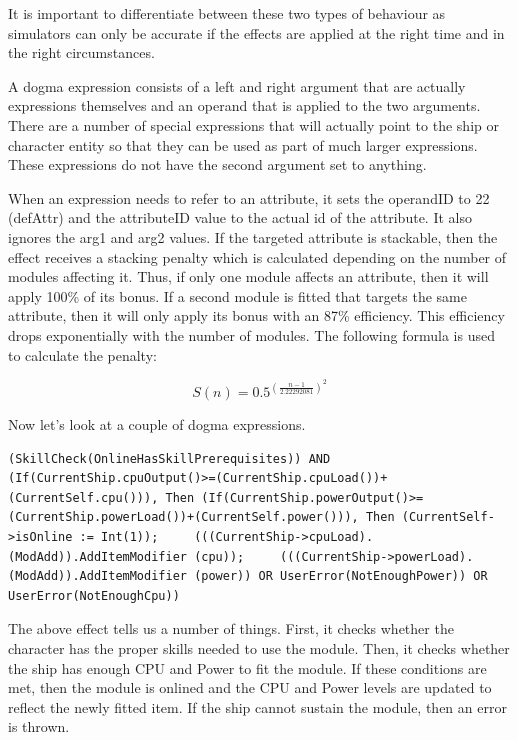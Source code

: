 It is important to differentiate between these two types of behaviour as simulators can only be accurate if the effects are applied at the right time and in the right circumstances.

A dogma expression consists of a left and right argument that are actually expressions themselves and an operand that is applied to the two arguments. There are a number of special expressions that will actually point to the ship or character entity so that they can be used as part of much larger expressions. These expressions do not have the second argument set to anything.

When an expression needs to refer to an attribute, it sets the operandID to 22 (defAttr) and the attributeID value to the actual id of the attribute. It also ignores the arg1 and arg2 values. If the targeted attribute is stackable, then the effect receives a stacking penalty which is calculated depending on the number of modules affecting it. Thus, if only one module affects an attribute, then it will apply 100\% of its bonus. If a second module is fitted that targets the same attribute, then it will only apply its bonus with an 87\% efficiency. This efficiency drops exponentially with the number of modules. The following formula is used to calculate the penalty:

\begin{equation}
S(n) = 0.5^{\left(\frac{n-1}{2.22292081}\right )^{2}}
\end{equation}

Now let’s look at a couple of dogma expressions.

\begin{lstlisting}[label=dogma_expr1, caption=An example of a dogma expression]
(SkillCheck(OnlineHasSkillPrerequisites)) AND (If(CurrentShip.cpuOutput()>=(CurrentShip.cpuLoad())+(CurrentSelf.cpu())), Then (If(CurrentShip.powerOutput()>=(CurrentShip.powerLoad())+(CurrentSelf.power())), Then (CurrentSelf->isOnline := Int(1));     (((CurrentShip->cpuLoad).(ModAdd)).AddItemModifier (cpu));     (((CurrentShip->powerLoad).(ModAdd)).AddItemModifier (power)) OR UserError(NotEnoughPower)) OR UserError(NotEnoughCpu))
\end{lstlisting}

The above effect tells us a number of things. First, it checks whether the character has the proper skills needed to use the module. Then, it checks whether the ship has enough CPU and Power to fit the module. If these conditions are met, then the module is onlined and the CPU and Power levels are updated to reflect the newly fitted item. If the ship cannot sustain the module, then an error is thrown.

